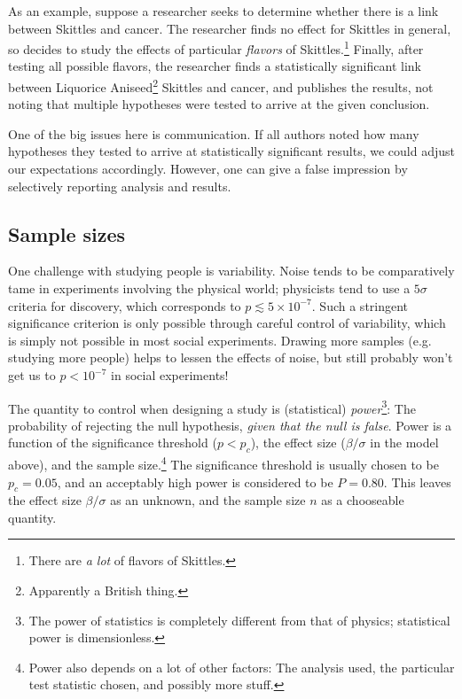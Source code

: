 \documentclass{tufte-handout}
\begin{document}
As an example, suppose a researcher seeks to determine whether there is a link
between Skittles and cancer. The researcher finds no effect for Skittles in
general, so decides to study the effects of particular \emph{flavors} of
Skittles.\footnote{There are \emph{a lot} of flavors of Skittles.} Finally, after
testing all possible flavors, the researcher finds a statistically significant
link between Liquorice Aniseed\footnote{Apparently a British thing.} Skittles and
cancer, and publishes the results, not noting that multiple hypotheses were
tested to arrive at the given conclusion.

One of the big issues here is communication. If all authors noted how many
hypotheses they tested to arrive at statistically significant results, we could
adjust our expectations accordingly. However, one can give a false impression
by selectively reporting analysis and results.

\subsection{Sample sizes}
\label{sec:org7d0bc30}
One challenge with studying people is variability. Noise tends to be
comparatively tame in experiments involving the physical world; physicists tend
to use a \(5\sigma\) criteria for discovery, which corresponds to
\(p\lesssim5\times10^{-7}\).\cite{demortier2007p} Such a stringent significance
criterion is only possible through careful control of variability, which is
simply not possible in most social experiments. Drawing more samples (e.g.
studying more people) helps to lessen the effects of noise, but still probably
won't get us to \(p<10^{-7}\) in social experiments!

The quantity to control when designing a study is (statistical) \emph{power}\footnote{The
power of statistics is completely different from that of physics; statistical
power is dimensionless.}: The probability of rejecting the null hypothesis,
\emph{given that the null is false}. Power is a function of the significance
threshold (\(p<p_c\)), the effect size (\(\beta/\sigma\) in the model above), and
the sample size.\footnote{Power also depends on a lot of other factors: The analysis
used, the particular test statistic chosen, and possibly more stuff.} The
significance threshold is usually chosen to be \(p_c=0.05\), and an acceptably
high power is considered to be \(P=0.80\). This leaves the effect size
\(\beta/\sigma\) as an unknown, and the sample size \(n\) as a chooseable
quantity.
\end{document}
